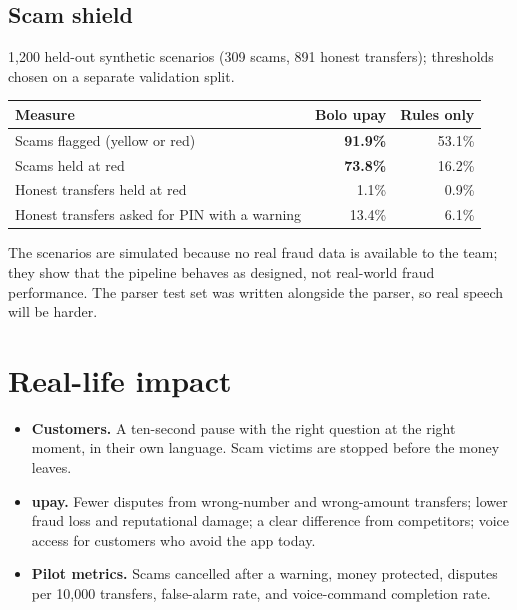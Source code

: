 \documentclass[11pt,a4paper]{article}
\begin{document}
\subsection{Scam shield}
1,200 held-out synthetic scenarios (309 scams, 891 honest transfers); thresholds chosen on a separate validation split.

\begin{tabularx}{\textwidth}{@{}X r r@{}}
\toprule
\sffamily\small Measure & \sffamily\small Bolo upay & \sffamily\small Rules only\\
\midrule
Scams flagged (yellow or red) & \textbf{91.9\%} & 53.1\%\\
Scams held at red & \textbf{73.8\%} & 16.2\%\\
Honest transfers held at red & 1.1\% & 0.9\%\\
Honest transfers asked for PIN with a warning & 13.4\% & 6.1\%\\
\bottomrule
\end{tabularx}

\vspace{2pt}
{\small\color{muted} The scenarios are simulated because no real fraud data is available to the team; they show that the pipeline behaves as designed, not real-world fraud performance. The parser test set was written alongside the parser, so real speech will be harder.}

\section{Real-life impact}

\begin{itemize}
  \item \textbf{Customers.} A ten-second pause with the right question at the right moment, in their own language. Scam victims are stopped before the money leaves.
  \item \textbf{upay.} Fewer disputes from wrong-number and wrong-amount transfers; lower fraud loss and reputational damage; a clear difference from competitors; voice access for customers who avoid the app today.
  \item \textbf{Pilot metrics.} Scams cancelled after a warning, money protected, disputes per 10,000 transfers, false-alarm rate, and voice-command completion rate.
\end{itemize}

\end{document}
